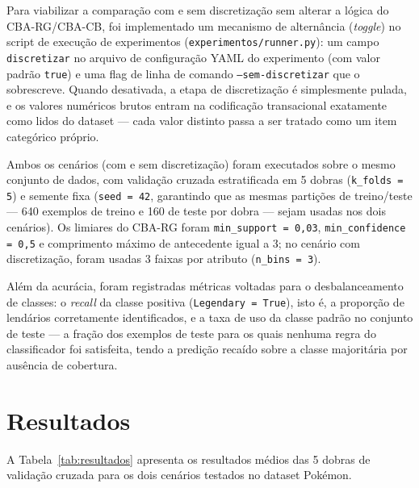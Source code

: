 \documentclass[a4paper,11pt]{article}
\begin{document}
Para viabilizar a comparação com e sem discretização sem alterar a lógica
do CBA-RG/CBA-CB, foi implementado um mecanismo de alternância
(\emph{toggle}) no script de execução de experimentos
(\texttt{experimentos/runner.py}): um campo \texttt{discretizar} no arquivo
de configuração YAML do experimento (com valor padrão \texttt{true}) e uma
flag de linha de comando \texttt{--sem-discretizar} que o sobrescreve.
Quando desativada, a etapa de discretização é simplesmente pulada, e os
valores numéricos brutos entram na codificação transacional exatamente como
lidos do dataset — cada valor distinto passa a ser tratado como um item
categórico próprio.

Ambos os cenários (com e sem discretização) foram executados sobre o mesmo
conjunto de dados, com validação cruzada estratificada em 5 dobras
(\texttt{k\_folds = 5}) e semente fixa (\texttt{seed = 42}, garantindo que
as mesmas partições de treino/teste — 640 exemplos de treino e 160 de teste
por dobra — sejam usadas nos dois cenários). Os limiares do CBA-RG foram
\texttt{min\_support = 0{,}03}, \texttt{min\_confidence = 0{,}5} e
comprimento máximo de antecedente igual a 3; no cenário com discretização,
foram usadas 3 faixas por atributo (\texttt{n\_bins = 3}).

Além da acurácia, foram registradas métricas voltadas para o
desbalanceamento de classes: o \emph{recall} da classe positiva
(\texttt{Legendary = True}), isto é, a proporção de lendários corretamente
identificados, e a taxa de uso da classe padrão no conjunto de teste — a
fração dos exemplos de teste para os quais nenhuma regra do classificador
foi satisfeita, tendo a predição recaído sobre a classe majoritária por
ausência de cobertura.

\section{Resultados}

A Tabela~\ref{tab:resultados} apresenta os resultados médios das 5 dobras
de validação cruzada para os dois cenários testados no dataset Pokémon.
\end{document}
